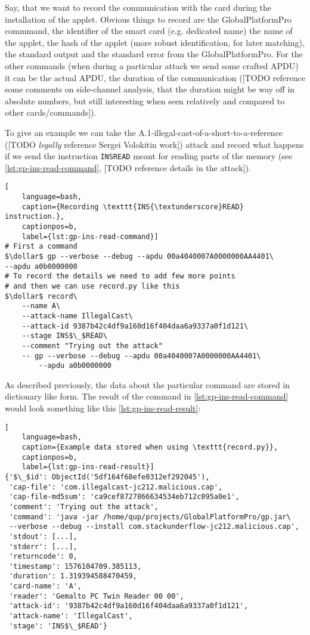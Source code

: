\documentclass[a4paper]{scrartcl}
\newcommand{\dollar}{\mbox{\textdollar}}
\begin{document}
Say, that we want to record the communication with the card during the installation of the applet. Obvious things to record are the GlobalPlatformPro commmand, the identifier of the smart card (e.g. dedicated name) the name of the applet, the hash of the applet (more robust identification, for later matching), the standard output and the standard error from the GlobalPlatformPro. For the other commands (when during a particular attack we send some crafted APDU) it can be the actual APDU, the duration of the communication ([TODO reference some comments on side-channel analysis, that the duration might be way off in absolute numbers, but still interesting when seen relatively and compared to other cards/commands]).

To give an example we can take the A.1-illegal-cast-of-a-short-to-a-reference ([TODO \textit{legally} reference Sergei Volokitin work]) attack and record what happens if we send the instruction \texttt{INS{\textunderscore}READ} meant for reading parts of the memory (see \ref{lst:gp-ins-read-command}, [TODO reference details in the attack]).

\begin{lstlisting}[
    language=bash,
    caption={Recording \texttt{INS{\textunderscore}READ} instruction.},
    captionpos=b,
    label={lst:gp-ins-read-command}]
# First a command
$\dollar$ gp --verbose --debug --apdu 00a4040007A0000000AA4401\
--apdu a0b0000000
# To record the details we need to add few more points
# and then we can use record.py like this
$\dollar$ record\
    --name A\
    --attack-name IllegalCast\
    --attack-id 9387b42c4df9a160d16f404daa6a9337a0f1d121\
    --stage INS$\_$READ\
    --comment "Trying out the attack"
    -- gp --verbose --debug --apdu 00a4040007A0000000AA4401\
        --apdu a0b0000000
\end{lstlisting}

As described previously, the data about the particular command are stored in dictionary like form. The result of the command in \ref{lst:gp-ins-read-command} would look something like this \ref{lst:gp-ins-read-result}:
\begin{lstlisting}[
    language=bash,
    caption={Example data stored when using \texttt{record.py}},
    captionpos=b,
    label={lst:gp-ins-read-result}]
{'$\_$id': ObjectId('5df164f68efe0312ef292045'),
 'cap-file': 'com.illegalcast-jc212.malicious.cap',
 'cap-file-md5sum': 'ca9cef8727866634534eb712c095a0e1',
 'comment': 'Trying out the attack',
 'command': 'java -jar /home/qup/projects/GlobalPlatformPro/gp.jar\
 --verbose --debug --install com.stackunderflow-jc212.malicious.cap',
 'stdout': [...],
 'stderr': [...],
 'returncode': 0,
 'timestamp': 1576104709.385113,
 'duration': 1.319394588470459,
 'card-name': 'A',
 'reader': 'Gemalto PC Twin Reader 00 00',
 'attack-id': '9387b42c4df9a160d16f404daa6a9337a0f1d121',
 'attack-name': 'IllegalCast',
 'stage': 'INS$\_$READ'}

\end{lstlisting}
\end{document}
